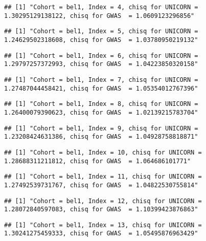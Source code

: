 \documentclass[]{article}
\begin{document}
\begin{verbatim}
## [1] "Cohort = bel1, Index = 4, chisq for UNICORN = 1.30295129138122, chisq for GWAS  = 1.0609123296856"
\end{verbatim}

\begin{verbatim}
## [1] "Cohort = bel1, Index = 5, chisq for UNICORN = 1.24629502318608, chisq for GWAS  = 1.03780950219132"
\end{verbatim}

\begin{verbatim}
## [1] "Cohort = bel1, Index = 6, chisq for UNICORN = 1.29797257372993, chisq for GWAS  = 1.04223850320158"
\end{verbatim}

\begin{verbatim}
## [1] "Cohort = bel1, Index = 7, chisq for UNICORN = 1.27487044458421, chisq for GWAS  = 1.05354012767396"
\end{verbatim}

\begin{verbatim}
## [1] "Cohort = bel1, Index = 8, chisq for UNICORN = 1.26400079390623, chisq for GWAS  = 1.02139215783704"
\end{verbatim}

\begin{verbatim}
## [1] "Cohort = bel1, Index = 9, chisq for UNICORN = 1.23208424631386, chisq for GWAS  = 1.04928758818871"
\end{verbatim}

\begin{verbatim}
## [1] "Cohort = bel1, Index = 10, chisq for UNICORN = 1.28688311211812, chisq for GWAS  = 1.064686101771"
\end{verbatim}

\begin{verbatim}
## [1] "Cohort = bel1, Index = 11, chisq for UNICORN = 1.27492539731767, chisq for GWAS  = 1.04822530755814"
\end{verbatim}

\begin{verbatim}
## [1] "Cohort = bel1, Index = 12, chisq for UNICORN = 1.28072840597083, chisq for GWAS  = 1.10399423876863"
\end{verbatim}

\begin{verbatim}
## [1] "Cohort = bel1, Index = 13, chisq for UNICORN = 1.30241275459333, chisq for GWAS  = 1.05495876963429"
\end{verbatim}
\end{document}
